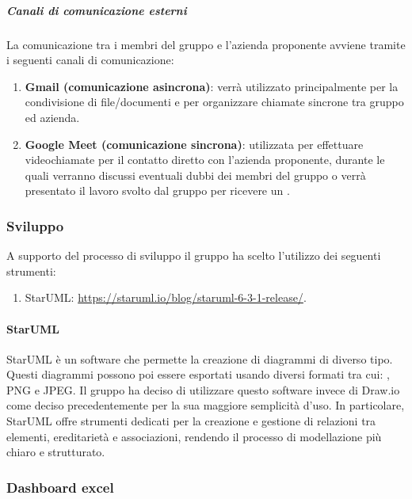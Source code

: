 \subparagraph{Canali di comunicazione esterni}
La comunicazione tra i membri del gruppo e l'azienda proponente avviene tramite i seguenti canali di comunicazione:
\begin{enumerate}
    \item \textbf{Gmail (comunicazione asincrona)}: verrà utilizzato principalmente per la condivisione di file/documenti e per organizzare chiamate sincrone tra gruppo ed azienda.

    \item \textbf{Google Meet (comunicazione sincrona)}: utilizzata per effettuare videochiamate per il contatto diretto con l'azienda proponente, durante le quali verranno discussi eventuali dubbi dei membri del gruppo o verrà presentato il lavoro svolto dal gruppo per ricevere un .
\end{enumerate}

\subsubsection{Sviluppo}
A supporto del processo di sviluppo il gruppo ha scelto l'utilizzo dei seguenti strumenti:
\begin{enumerate}
    \item StarUML: \href{https://staruml.io/blog/staruml-6-3-1-release/}{https://staruml.io/blog/staruml-6-3-1-release/}.
\end{enumerate}

\paragraph{StarUML}
\label{par:staruml}
StarUML è un software che permette la creazione di diagrammi di diverso tipo.
Questi diagrammi possono poi essere esportati usando diversi formati tra cui: , PNG e JPEG.
Il gruppo ha deciso di utilizzare questo software invece di Draw.io come deciso precedentemente per la sua maggiore semplicità d'uso.
In particolare, StarUML offre strumenti dedicati per la creazione e gestione di relazioni tra elementi, ereditarietà e associazioni, rendendo il processo di modellazione più chiaro e strutturato.

\subsubsection{Dashboard excel}
\label{subpar:dashboard_excel}
